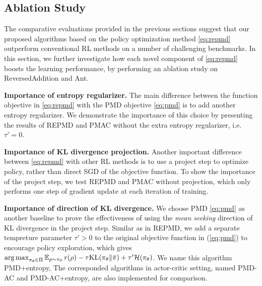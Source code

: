 
\subsection{Ablation Study}
\label{subsec:ablationstudy}

The comparative evaluations provided in the previous sections suggest that our proposed algorithms based on the policy optimization method \ref{eq:repmd} outperform conventional RL methods on a number of challenging benchmarks. In this section, we further investigate how each novel component of \cref{eq:repmd} boosts the learning performance, by performing an ablation study on ReversedAddition and Ant.


\textbf{Importance of entropy regularizer.} The main difference between the function objective in \cref{eq:repmd} with the PMD objective \cref{eq:pmd} is to add another entropy regularizer. We demonstrate the importance of this choice by presenting the results of REPMD and PMAC without the extra entropy regularizer, i.e. $\tau'=0$.

\textbf{Importance of KL divergence projection.} Another important difference between \cref{eq:repmd} with other RL methods is to use a project step to optimize policy, rather than direct SGD of the objective function. To show the importance of the project step, we test REPMD and PMAC without projection, which only performs one step of gradient update at each iteration of training. 

\textbf{Importance of direction of KL divergence.} We choose PMD \ref{eq:pmd} as another baseline to prove the effectiveness of using the \emph{mean seeking} direction of KL divergence in the project step. Similar as in REPMD, we add a separate tempreture parameter $\tau' > 0$ to the original objective function in (\ref{eq:pmd}) to encourage policy exploration, which gives $\operatorname*{arg\,max}_{\pi_\theta \in \Pi}{ \operatorname*{\mathbb{E}}_{\rho \sim \pi_\theta}{  r(\rho)  - \tau \text{KL}(\pi_\theta \| \bar{\pi}) } + \tau'\mathcal{H}(\pi_\theta) }$. We name this algorithm PMD+entropy, The corresponded algorithms in actor-critic setting, named PMD-AC and PMD-AC+entropy, are also implemented for comparison.


